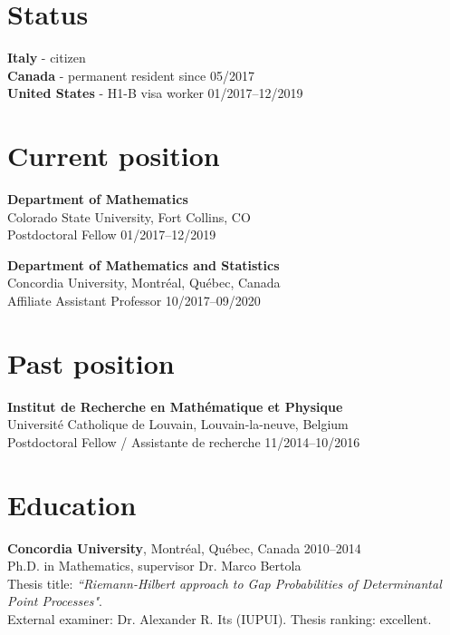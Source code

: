 \documentclass[margin]{res}
\begin{document}
 
\begin{resume} 

 \section{Status}
 
 {\bf Italy} - citizen  \\
 {\bf Canada} - permanent resident \hfill since 05/2017 \\
 {\bf United States} - H1-B visa worker \hfill 01/2017--12/2019

 
 \section{Current position}
  {\bf Department of Mathematics} \\
 Colorado State University, Fort Collins, CO \\
 Postdoctoral Fellow \hfill 01/2017--12/2019 
 
  {\bf Department of Mathematics and Statistics} \\
 Concordia University, Montr\'eal, Qu\'ebec, Canada \\
Affiliate Assistant Professor \hfill 10/2017--09/2020



 \section{Past position}
  {\bf Institut de Recherche en Math\'ematique et Physique} \\
 Universit\'e Catholique de Louvain, Louvain-la-neuve, Belgium \\
Postdoctoral Fellow / Assistante de recherche \hfill 11/2014--10/2016 \\



\section{Education}

{\bf Concordia University}, Montr\'eal, Qu\'ebec, Canada \hfill 2010--2014 \\
 Ph.D. in Mathematics, supervisor Dr. Marco Bertola\\
 Thesis title: \emph{``Riemann-Hilbert approach to Gap Probabilities of Determinantal Point Processes"}. \\
 External examiner: Dr. Alexander R. Its (IUPUI). Thesis ranking: excellent.


\end{resume}
\end{document}
